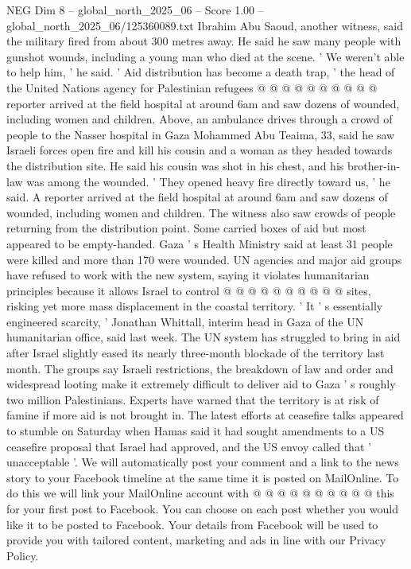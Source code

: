 \begin{textsample}{NEG Dim 8 – global\_north\_2025\_06 – Score 1.00 – global\_north\_2025\_06/125360089.txt}
Ibrahim Abu Saoud, another witness, said the military fired from about 300 metres away.
He said he saw many people with gunshot wounds, including a young man who died at the scene. ' We weren't able to help him, ' he said. ' Aid distribution has become a death trap, ' the head of the United Nations agency for Palestinian refugees @ @ @ @ @ @ @ @ @ @ reporter arrived at the field hospital at around 6am and saw dozens of wounded, including women and children.
Above, an ambulance drives through a crowd of people to the Nasser hospital in Gaza Mohammed Abu Teaima, 33, said he saw Israeli forces open fire and kill his cousin and a woman as they headed towards the distribution site.
He said his cousin was shot in his chest, and his brother-in-law was among the wounded. ' They opened heavy fire directly toward us, ' he said.
A reporter arrived at the field hospital at around 6am and saw dozens of wounded, including women and children.
The witness also saw crowds of people returning from the distribution point.
Some carried boxes of aid but most appeared to be empty-handed.
Gaza ' s Health Ministry said at least 31 people were killed and more than 170 were wounded.
UN agencies and major aid groups have refused to work with the new system, saying it violates humanitarian principles because it allows Israel to control @ @ @ @ @ @ @ @ @ @ sites, risking yet more mass displacement in the coastal territory. ' It ' s essentially engineered scarcity, ' Jonathan Whittall, interim head in Gaza of the UN humanitarian office, said last week.
The UN system has struggled to bring in aid after Israel slightly eased its nearly three-month blockade of the territory last month.
The groups say Israeli restrictions, the breakdown of law and order and widespread looting make it extremely difficult to deliver aid to Gaza ' s roughly two million Palestinians.
Experts have warned that the territory is at risk of famine if more aid is not brought in.
The latest efforts at ceasefire talks appeared to stumble on Saturday when Hamas said it had sought amendments to a US ceasefire proposal that Israel had approved, and the US envoy called that ' unacceptable '.
We will automatically post your comment and a link to the news story to your Facebook timeline at the same time it is posted on MailOnline.
To do this we will link your MailOnline account with @ @ @ @ @ @ @ @ @ @ this for your first post to Facebook.
You can choose on each post whether you would like it to be posted to Facebook.
Your details from Facebook will be used to provide you with tailored content, marketing and ads in line with our Privacy Policy.

\end{textsample}
